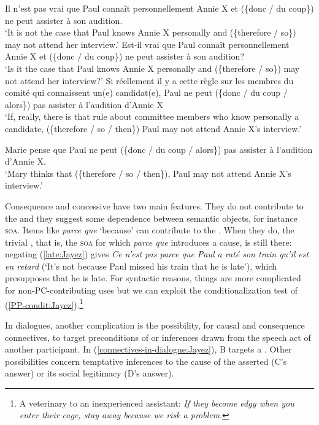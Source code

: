 \documentclass[output=paper,colorlinks,citecolor=brown]{langscibook}
\begin{document}
\ea
\label{PP:Jayez}
\ea \label{PP-neg:Jayez}
Il n'est pas vrai que Paul connaît personnellement Annie X et (\{donc / du coup\}) ne peut assister à son audition.\\
`It is not the case that Paul knows Annie X personally and (\{therefore / so\}) may not attend her interview.'
\ex \label{PP-interr:Jayez}
Est-il vrai que Paul connaît personnellement Annie X et (\{donc / du coup\}) ne peut assister à son audition?\\
`Is it the case that Paul knows Annie X personally and (\{therefore / so\}) may not attend her interview?'
\ex \label{PP-condit:Jayez}
Si réellement il y a cette règle sur les membres du comité qui connaissent un(e) candidat(e), Paul ne peut (\{donc / du coup / alors\}) pas assister à l'audition d'Annie X\\
`If, really, there is that rule about committee members who know personally a candidate, (\{therefore / so / then\}) Paul may not attend Annie X's interview.'
\z
\z

\ea \label{local-effect:Jayez}
Marie pense que Paul ne peut (\{donc / du coup / alors\}) pas assister à l'audition d'Annie X.\\
`Mary thinks that (\{therefore / so / then\}), Paul may not attend Annie X's interview.'
\z

Consequence and concessive  have two main features. They do not contribute to the  and they suggest some dependence between semantic objects, for instance \textsc{soa}. Items like \textit{parce que} `because' can contribute to the . When they do, the trivial , that is, the \textsc{soa} for which \textit{parce que} introduces a cause, is still there: negating (\ref{late:Jayez}) gives \textit{Ce n'est pas parce que Paul a raté son train qu'il est en retard} (`It's not because Paul missed his train that he is late'), which presupposes that he is late. For syntactic reasons, things are more complicated for non-PC-contributing uses but we can exploit the conditionalization test of (\ref{PP-condit:Jayez}).\footnote{A veterinary to an inexperienced assistant: \textit{If they become edgy when you enter their cage, stay away  \textit{because we risk a problem}}.}

In dialogues, another complication is the possibility, for causal and consequence connectives, to target preconditions of or inferences drawn from the speech act of another participant. In (\ref{connectives-in-dialogue:Jayez}), B targets a . Other possibilities concern temptative inferences to the cause of the asserted  (C's answer) or its social legitimacy (D's answer).
\end{document}
